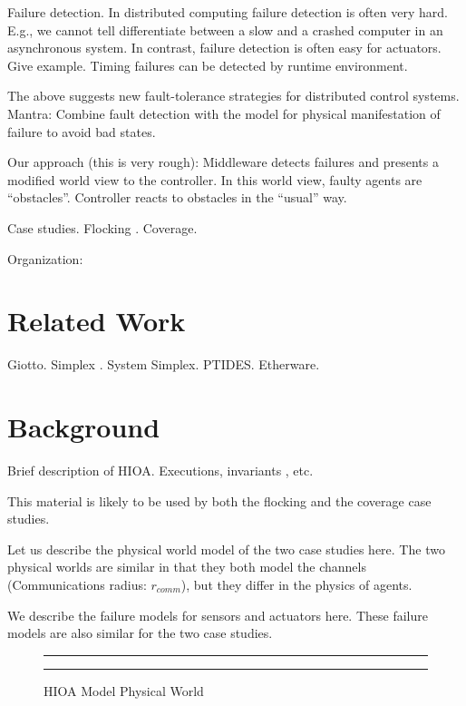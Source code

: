 \documentclass[10pt, conference, compsocconf]{IEEEtran}
\begin{document}
Failure detection.
In distributed computing failure detection is often very hard.
E.g., we cannot tell differentiate between a slow and
a crashed computer in an asynchronous system.
In contrast, failure detection is often easy 
for actuators. Give example.  
Timing failures can be detected by runtime environment.

The above suggests new fault-tolerance strategies
for distributed control systems.
Mantra: 
Combine fault detection with the model for physical manifestation
of failure to avoid bad states. 

Our approach (this is very rough):
Middleware detects failures and presents a modified 
world view to the controller. In this world view, faulty agents
are ``obstacles''. Controller reacts to obstacles in the ``usual'' way.

Case studies. Flocking \cite{olfatiFlocking2006}. Coverage.

Organization:

\section{Related Work}
\label{sec:rw}
Giotto. \cite{HenzingerGiotto2001}
Simplex \cite{ShaACC1998}.  System Simplex. \cite{BakRTSS2009}
PTIDES. \cite{ptidesRTSS2009}
Etherware. \cite{KumarEtherware2004}

\section{Background}
\label{sec:basics}
Brief description of HIOA. \cite{lynchHioa2003}
Executions, invariants \cite{lynchTa1996}, etc. 

This material is likely to be used by
both the flocking and the coverage 
case studies.

%
Let us describe the 
physical world model of the two case studies here.
%
The two physical worlds are similar in that
they both model the channels (Communications radius: $r_{comm}$), 
but they differ in the physics of agents. 
%



We describe the failure models for sensors 
and actuators here. These failure models are also 
similar for the two case studies. 

\begin{figure}[h!]
\centering
  \hrule
  {}
  \hrule
  \caption{HIOA Model Physical World}
  \label{fig:physicalWorld}
\end{figure}
\end{document}
